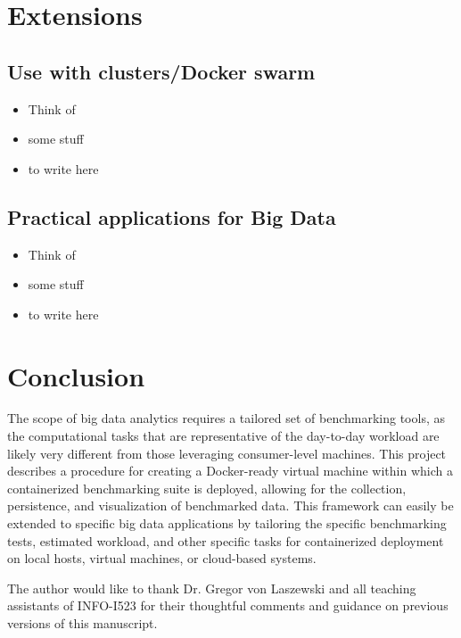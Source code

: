 \documentclass[sigconf]{acmart}
\begin{document}
\section{Extensions}

\subsection{Use with clusters/Docker swarm}

\begin{itemize}
  \item Think of
  \item some stuff
  \item to write here
\end{itemize}

\subsection{Practical applications for Big Data}

\begin{itemize}
  \item Think of
  \item some stuff
  \item to write here
\end{itemize}

\section{Conclusion}
The scope of big data analytics requires a tailored set of benchmarking tools, as the computational tasks that are representative of the day-to-day workload are likely very different from those leveraging consumer-level machines. This project describes a procedure for creating a Docker-ready virtual machine within which a containerized benchmarking suite is deployed, allowing for the collection, persistence, and visualization of benchmarked data. This framework can easily be extended to specific big data applications by tailoring the specific benchmarking tests, estimated workload, and other specific tasks for containerized deployment on local hosts, virtual machines, or cloud-based systems.

\begin{acks}

The author would like to thank Dr. Gregor von Laszewski and all teaching assistants of INFO-I523 for their thoughtful comments and guidance on previous versions of this manuscript.

\end{acks}
\end{document}
